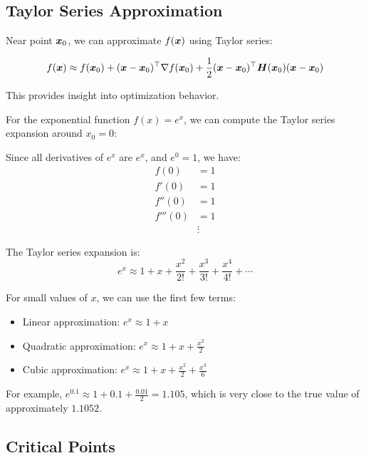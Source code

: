 \subsection{Taylor Series Approximation}

Near point $\boldsymbol{x}_0$, we can approximate $f(\boldsymbol{x})$ using Taylor series:

\begin{equation}
f(\boldsymbol{x}) \approx f(\boldsymbol{x}_0) + (\boldsymbol{x} - \boldsymbol{x}_0)^\top \nabla f(\boldsymbol{x}_0) + \frac{1}{2}(\boldsymbol{x} - \boldsymbol{x}_0)^\top \boldsymbol{H}(\boldsymbol{x}_0) (\boldsymbol{x} - \boldsymbol{x}_0)
\end{equation}

This provides insight into optimization behavior.

\begin{example}[Taylor Series for $f(x) = e^x$ around $x_0 = 0$]
For the exponential function $f(x) = e^x$, we can compute the Taylor series expansion around $x_0 = 0$:

Since all derivatives of $e^x$ are $e^x$, and $e^0 = 1$, we have:
\begin{align}
f(0) &= 1 \\
f'(0) &= 1 \\
f''(0) &= 1 \\
f'''(0) &= 1 \\
&\vdots
\end{align}

The Taylor series expansion is:
\begin{equation}
e^x \approx 1 + x + \frac{x^2}{2!} + \frac{x^3}{3!} + \frac{x^4}{4!} + \cdots
\end{equation}

For small values of $x$, we can use the first few terms:
\begin{itemize}
    \item Linear approximation: $e^x \approx 1 + x$
    \item Quadratic approximation: $e^x \approx 1 + x + \frac{x^2}{2}$
    \item Cubic approximation: $e^x \approx 1 + x + \frac{x^2}{2} + \frac{x^3}{6}$
\end{itemize}

For example, $e^{0.1} \approx 1 + 0.1 + \frac{0.01}{2} = 1.105$, which is very close to the true value of approximately $1.1052$.
\end{example}

\subsection{Critical Points}

